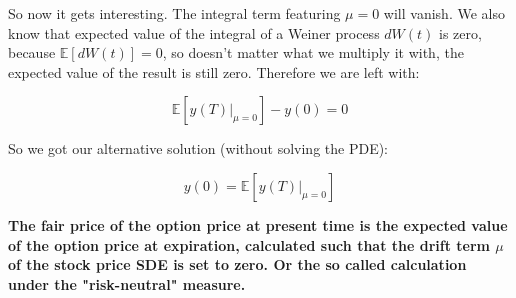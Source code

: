 \documentclass{article}
\begin{document}
So now it gets interesting. The integral term featuring $\mu = 0$ will vanish. We also know that expected value of the integral of a Weiner process $dW(t)$ is zero, because $\mathbb{E}[dW(t)] = 0$, so doesn't matter what we multiply it with, the expected value of the result is still zero. Therefore we are left with:

\begin{equation}
    \mathbb{E}[y(T)\Big|_{\mu=0}^{}] - y(0) = 0
\end{equation}

So we got our alternative solution (without solving the PDE):

\begin{equation}
    y(0) = \mathbb{E}[y(T)\Big|_{\mu=0}^{}]
\end{equation}

\textbf{The fair price of the option price at present time is the expected value of the option price at expiration, calculated such that the drift term $\mu$ of the stock price SDE is set to zero. Or the so called calculation under the "risk-neutral" measure.}
\end{document}
